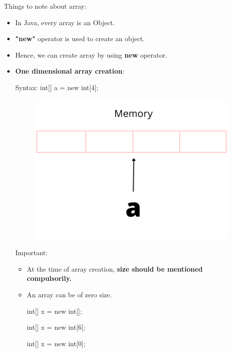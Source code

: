 \setlength{\columnsep}{3pt}
\begin{flushleft}
	\bigskip
	
	Things to note about array:
	\begin{itemize}
		\item In Java, every array is an Object.
		\item \textbf{"new"} operator is used to create an object.
		\item Hence, we can create array by using \textbf{new} operator.
	\end{itemize}
	
	
	\begin{itemize}
		
		\item \textbf{One dimensional array creation}:
		
		\begin{tcolorbox}[breakable,notitle,boxrule=1pt,colback=pink,colframe=pink]
			\color{black}
			\font=8pt
			Syntax:  \newline
			int[] a = new int[4];
			\font=4pt
		\end{tcolorbox}
		
		
		\begin{figure}[h!]
			\centering
			\includegraphics[scale=.45]{content/chapter4/images/array.png}
		\end{figure}	
		
		Important:
		\begin{itemize}
			\item At the time of array creation, \textbf{size should be mentioned compulsorily.}
			\item An array can be of zero size.
			\begin{tcolorbox}[breakable,notitle,boxrule=-0pt,colback=code,colframe=code]
				\color{black}
				\font=8pt
				int[] x = new int[]; \xmark \par
				int[] x = new int[6]; \cmark  \par
				int[] x = new int[0]; \cmark 
				\font=4pt
			\end{tcolorbox}
			

\end{itemize}
\end{itemize}
\end{flushleft}
